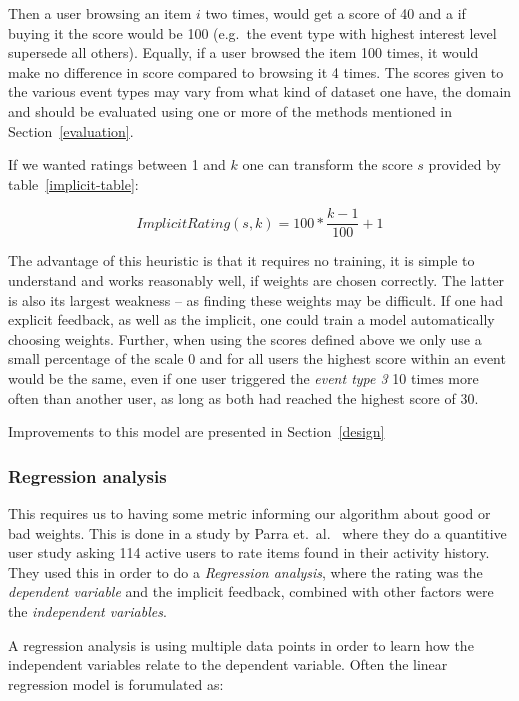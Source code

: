 Then a user browsing an item $i$ two times, would get a score of 40 and a if
buying it the score would be 100 (e.g.\ the event type with highest interest
level supersede all others). Equally, if a user browsed the item 100 times, it
would make no difference in score compared to browsing it 4 times. The scores
given to the various event types may vary from what kind of dataset one have,
the domain and should be evaluated using one or more of the methods mentioned
in Section~\ref{evaluation}.

If we wanted ratings between 1 and $k$ one can transform the score $s$ provided
by table~\ref{implicit-table}:

\begin{equation}
  ImplicitRating(s, k) = 100 * \frac{k-1}{100} + 1
\end{equation}

The advantage of this heuristic is that it requires no training, it is simple
to understand and works reasonably well, if weights are chosen correctly.
The latter is also its largest weakness – as finding these weights may be
difficult. If one had explicit feedback, as well as the implicit, one could
train a model automatically choosing weights. Further, when using the scores
defined above we only use a small percentage of the scale 0 and for all
users the highest score within an event would be the same, even if one user
triggered the \textit{event type 3} 10 times more often than another user, as
long as both had reached the highest score of 30.

Improvements to this model are presented in Section~\ref{design}

\subsubsection{Regression analysis}

This requires us to having some metric informing our algorithm about good or
bad weights. This is done in a study by Parra et.\ al.~\cite{parra2011walk}
where they do a quantitive user study asking 114 active users to rate items
found in their activity history. They used this in order to do
a \textit{Regression analysis}, where the rating was the \textit{dependent
variable} and the implicit feedback, combined with other factors were the
\textit{independent variables}.

A regression analysis is using multiple data points in order to learn how the
independent variables relate to the dependent variable. Often the linear
regression model is forumulated as:

